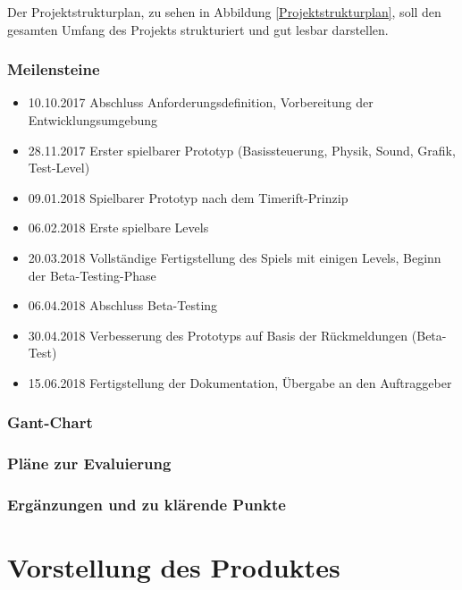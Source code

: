 Der Projektstrukturplan, zu sehen in Abbildung \ref{Projektstrukturplan}, soll den gesamten Umfang des Projekts strukturiert und gut lesbar darstellen.

\subsection{Meilensteine}\begin{itemize}
	\item 10.10.2017 Abschluss Anforderungsdefinition, Vorbereitung der Entwicklungsumgebung	
	\item 28.11.2017 Erster spielbarer Prototyp (Basissteuerung, Physik, Sound, Grafik, Test-Level)	
	\item 09.01.2018 Spielbarer Prototyp nach dem Timerift-Prinzip	
	\item 06.02.2018 Erste spielbare Levels	
	\item 20.03.2018 Vollständige Fertigstellung des Spiels mit einigen Levels, Beginn der Beta-Testing-Phase	
	\item 06.04.2018 Abschluss Beta-Testing	
	\item 30.04.2018 Verbesserung des Prototyps auf Basis der Rückmeldungen (Beta-Test)
	\item 15.06.2018 Fertigstellung der Dokumentation, Übergabe an den Auftraggeber
\end{itemize}
\subsection{Gant-Chart}

\subsection{Pläne zur Evaluierung}
\subsection{Ergänzungen und zu klärende Punkte}
\chapter{Vorstellung des Produktes}
